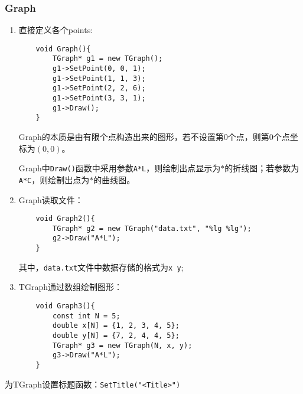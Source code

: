 \documentclass{article}
\begin{document}
\subsubsection{Graph}
\begin{enumerate}
    \item 直接定义各个points:
          \begin{lstlisting}
    void Graph(){
        TGraph* g1 = new TGraph();
        g1->SetPoint(0, 0, 1);
        g1->SetPoint(1, 1, 3);
        g1->SetPoint(2, 2, 6);
        g1->SetPoint(3, 3, 1);
        g1->Draw();
    }
\end{lstlisting}

          Graph的本质是由有限个点构造出来的图形，若不设置第$ 0 $个点，则第$ 0 $个点坐标为$ \left( 0, 0 \right) $。

          Graph中\texttt{Draw()}函数中采用参数\texttt{A*L}，则绘制出点显示为$ * $的折线图；若参数为\texttt{A*C}，则绘制出点为$ * $的曲线图。
    \item Graph读取文件：
          \begin{lstlisting}
    void Graph2(){
        TGraph* g2 = new TGraph("data.txt", "%lg %lg");
        g2->Draw("A*L");
    }
\end{lstlisting}
          其中，\texttt{data.txt}文件中数据存储的格式为\texttt{x   y};
    \item TGraph通过数组绘制图形：
          \begin{lstlisting}
    void Graph3(){
        const int N = 5;
        double x[N] = {1, 2, 3, 4, 5};
        double y[N] = {7, 2, 4, 4, 5};
        TGraph* g3 = new TGraph(N, x, y);
        g3->Draw("A*L");
    }
\end{lstlisting}
\end{enumerate}

为TGraph设置标题函数：\texttt{SetTitle("<Title>")}
\end{document}
